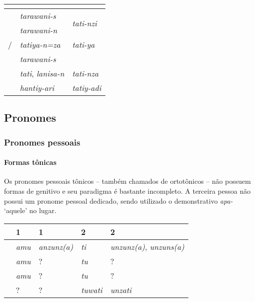 \begin{center}
	\begin{tabular}[c]{lll}
		\toprule
		                      & \Sg{}\emph{}                 & \Pl{}\emph{}                       \\
		\midrule
		\Nom{} \Com{}         & \emph{tarawani-s}            & \multirow{2}{4em}{\emph{tati-nzi}} \\
		\Acu{} \Com{}         & \emph{tarawani-n}            &                                    \\
		\Nom{}/\Acu{} \Neut{} & \emph{tatiya-n=za}           & \emph{tati-ya}                     \\
		\Gen{}                & \emph{tarawani-s}            &                                    \\
		\Dat{}                & \emph{tati}, \emph{lanisa-n} & \emph{tati-nza}                    \\
		\Abl{}                & \emph{hantiy-ari}            & \emph{tatiy-adi}                   \\
		\bottomrule
	\end{tabular}
\end{center}


\subsection{Pronomes}

\subsubsection{Pronomes pessoais}

\paragraph{Formas tônicas}
Os pronomes pessoais tônicos -- também chamados de
ortotônicos -- não possuem formas de genitivo e seu paradigma é bastante
incompleto. A terceira pessoa não possui um pronome pessoal dedicado, sendo
utilizado o demonstrativo \emph{apa-} `aquele' no lugar.


\begin{center}
	\begin{tabular}[c]{lll|ll}
		\toprule
		       & 1\Sg{}\emph{} & 1\Pl{}\emph{}      & 2\Sg{}\emph{} & 2\Pl{}\emph{}                          \\
		\midrule
		\Nom{} & \emph{amu}    & \emph{anzunz{(a)}} & \emph{ti}     & \emph{unzunz{(a)}}, \emph{unzuns{(a)}} \\
		\Acu{} & \emph{amu}    & {?}\emph{}         & \emph{tu}     & {?}\emph{}                             \\
		\Dat{} & \emph{amu}    & {?}\emph{}         & \emph{tu}     & {?}\emph{}                             \\
		\Abl{} & {?}\emph{}    & {?}\emph{}         & \emph{tuwati} & \emph{unzati}                          \\
		\bottomrule
	\end{tabular}
\end{center}

